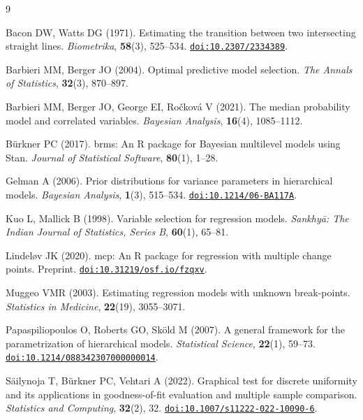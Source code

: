 \documentclass[12pt]{article}
\newcommand{\pkg}[1]{\textsf{#1}}
\newcommand{\doi}[1]{\href{https://doi.org/#1}{\texttt{doi:#1}}}
\begin{document}
\begin{thebibliography}{9}

Bacon DW, Watts DG (1971).
\newblock Estimating the transition between two intersecting straight lines.
\newblock \textit{Biometrika}, \textbf{58}(3), 525--534. \doi{10.2307/2334389}.

Barbieri MM, Berger JO (2004).
\newblock Optimal predictive model selection.
\newblock \textit{The Annals of Statistics}, \textbf{32}(3), 870--897.

Barbieri MM, Berger JO, George EI, Ročková V (2021).
\newblock The median probability model and correlated variables.
\newblock \textit{Bayesian Analysis}, \textbf{16}(4), 1085--1112.

Bürkner PC (2017).
\newblock \pkg{brms}: An R package for Bayesian multilevel models using Stan.
\newblock \textit{Journal of Statistical Software}, \textbf{80}(1), 1--28.

Gelman A (2006).
\newblock Prior distributions for variance parameters in hierarchical models.
\newblock \textit{Bayesian Analysis}, \textbf{1}(3), 515--534. \doi{10.1214/06-BA117A}.

Kuo L, Mallick B (1998).
\newblock Variable selection for regression models.
\newblock \textit{Sankhy\={a}: The Indian Journal of Statistics, Series B}, \textbf{60}(1), 65--81.

Lindeløv JK (2020).
\newblock \pkg{mcp}: An R package for regression with multiple change points.
\newblock Preprint. \doi{10.31219/osf.io/fzqxv}.

Muggeo VMR (2003).
\newblock Estimating regression models with unknown break-points.
\newblock \textit{Statistics in Medicine}, \textbf{22}(19), 3055--3071.

Papaspiliopoulos O, Roberts GO, Sköld M (2007).
\newblock A general framework for the parametrization of hierarchical models.
\newblock \textit{Statistical Science}, \textbf{22}(1), 59--73. \doi{10.1214/088342307000000014}.

S\"ailynoja T, B\"urkner PC, Vehtari A (2022).
\newblock Graphical test for discrete uniformity and its applications in goodness-of-fit evaluation and multiple sample comparison.
\newblock \textit{Statistics and Computing}, \textbf{32}(2), 32. \doi{10.1007/s11222-022-10090-6}.


\end{thebibliography}
\end{document}
